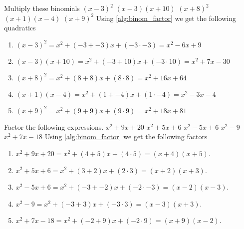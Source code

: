 \begin{ExerciseList}
\Exercise Multiply these binomials
\Question $(x-3)^2$
\Question $(x-3)(x+10)$
\Question $(x+8)^2$
\Question $(x+1)(x-4)$
\Question $(x+9)^2$
\Answer Using \ref{alg:binom_factor} we get the following quadratics
\begin{enumerate}
\item\myindent $(x-3)^2 = x^2 + (-3 + -3)x + (-3 \cdot -3) = x^2 - 6x + 9$
\item\myindent $(x-3)(x+10) = x^2 + (-3 + 10)x + (-3 \cdot 10) = x^2 + 7x - 30$
\item\myindent $(x+8)^2 = x^2 + (8+8)x + (8\cdot8) = x^2 + 16x + 64$
\item\myindent $(x+1)(x-4) = x^2 + (1 + -4)x + (1 \cdot -4) = x^2 - 3x - 4$
\item\myindent $(x+9)^2 = x^2 + (9+9)x + (9\cdot9) = x^2 + 18x + 81$
\end{enumerate}

\Exercise Factor the following expressions.
\Question $x^2 + 9x + 20$
\Question $x^2 + 5x + 6$
\Question $x^2 - 5x + 6$
\Question $x^2 - 9$
\Question $x^2 + 7x - 18$
\Answer Using \ref{alg:binom_factor} we get the following factors
\begin{enumerate}
\item\myindent $x^2 + 9x + 20 = x^2 + (4 + 5)x + (4\cdot5) = (x+4)(x+5)$.
\item\myindent $x^2 + 5x + 6 = x^2 + (3 + 2)x + (2\cdot3) = (x+2)(x+3)$.
\item\myindent $x^2 - 5x + 6 = x^2 + (-3 + -2)x + (-2\cdot-3) = (x-2)(x-3)$.
\item\myindent $x^2 - 9 = x^2  + (-3 + 3)x + (-3\cdot3) = (x-3)(x+3)$.
\item\myindent $x^2 + 7x - 18 = x^2 + (-2 + 9)x + (-2\cdot9) = (x+9)(x-2)$.
\end{enumerate}

\end{ExerciseList}
